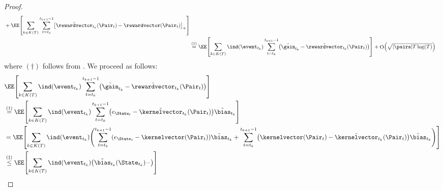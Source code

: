 \documentclass[preprint,cleveref,12pt]{colt2025}
\DeclarePairedDelimiter{\brackets}{[}{]}	%
\DeclarePairedDelimiter{\parens}{(}{)}	%
\DeclarePairedDelimiter{\abs}{\lvert}{\rvert}	%
\DeclarePairedDelimiter{\pospart}{[}{]_{+}}	%
\newcommand{\tsqrt}[1]{{\textstyle\sqrt{#1}}} %
\newcommand{\indic}[1]{\ind\parens{#1}}
\def\indicator{\indic}
\DeclareMathOperator*{\OH}{\mathrm{O}}
\def\kernel{\kernelvector}
\def\reward{\rewardvector}
\begin{document}
\begin{proof}
\begin{align*}
{{                }
            }
            +
            \EE \brackets*{
                \sum_{k \in K(T)}
                \sum_{t = t_k}^{t_{k+1} - 1}
                \pospart*{
                    \tilde{\reward}_{t_k}(\Pair_t)
                    -
                    \reward(\Pair_t)
                }
            }
            \\
            & \overset{(\dagger)}=
            \EE \brackets*{
                \sum_{k \in K(T)}
                \indicator{\event_{t_k}}
                \sum_{t = t_k}^{t_{k+1} - 1}
                \parens*{
                    \tilde{\gain}_{t_k} - \tilde{\reward}_{t_k}(\Pair_t)
                }
            }
            +
            \OH \parens*{
                \tsqrt{\abs{\pairs} T \log(T)}
            }
        \end{align*}
        where $(\dagger)$ follows from .
        We proceed as follows:
        \begin{align*}
            &
            \EE \brackets*{
                \sum_{k \in K(T)}
                \indicator{\event_{t_k}}
                \sum_{t = t_k}^{t_{k+1} - 1}
                \parens*{
                    \tilde{\gain}_{t_k} - \tilde{\reward}_{t_k}(\Pair_t)
                }
            }
            \\
            & \overset{(\dagger)}=
            \EE \brackets*{
                \sum_{k \in K(T)}
                \indicator{\event_{t_k}}
                \sum_{t = t_k}^{t_{k+1} - 1}
                \parens*{
                    e_{\State_t} - \tilde{\kernel}_{t_k}(\Pair_t)
                } \tilde{\bias}_{t_k}
            }
            \\
            & =
            \EE \brackets*{
                \sum_{k \in K(T)}
                \indicator{\event_{t_k}}
                \parens*{
                    \sum_{t = t_k}^{t_{k+1} - 1}
                    \parens*{
                        e_{\State_t} - \kernel(\Pair_t)
                    } \tilde{\bias}_{t_k}
                    +
                    \sum_{t = t_k}^{t_{k+1} - 1}
                    \parens*{
                        \kernel(\Pair_t) - \tilde{\kernel}_{t_k}(\Pair_t)
                    } \tilde{\bias}_{t_k}
                }
            }
            \\
            & \overset{(\ddagger)}\le
            \EE \brackets*{
                \sum_{k \in K(T)}
                \indicator{\event_{t_k}}
                \parens*{
                    \tilde{\bias}_{t_k}(\State_{t_k})
                    -
}}
\end{align*}
\end{proof}
\end{document}
